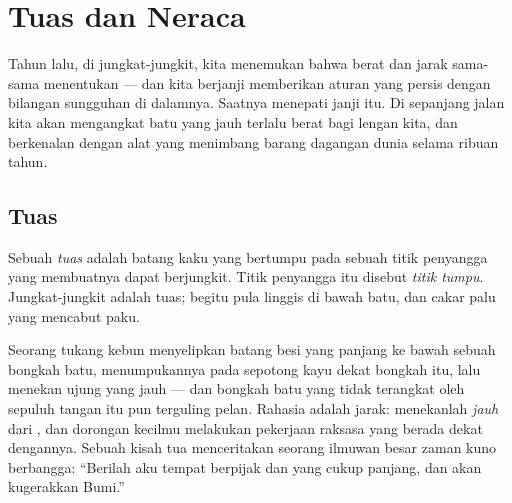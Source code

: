 \chapter{Tuas dan Neraca}\label{ch:g3:levers-and-scales}

Tahun lalu, di jungkat-jungkit, kita menemukan bahwa berat dan jarak
sama-sama menentukan --- dan kita berjanji memberikan aturan yang
persis dengan bilangan sungguhan di dalamnya. Saatnya menepati janji
itu. Di sepanjang jalan kita akan mengangkat batu yang jauh terlalu
berat bagi lengan kita, dan berkenalan dengan alat yang menimbang
barang dagangan dunia selama ribuan tahun.

\section{Tuas}

\begin{definition}\label{def:g3:levers-and-scales:lever}
Sebuah \emph{tuas} adalah batang kaku yang bertumpu pada
sebuah titik penyangga yang membuatnya dapat berjungkit. Titik
penyangga itu disebut \emph{titik tumpu}.
Jungkat-jungkit adalah tuas; begitu pula linggis di bawah batu, dan
cakar palu yang mencabut paku.
\end{definition}

\begin{example}\label{ex:g3:levers-and-scales:crowbar}
Seorang tukang kebun menyelipkan batang besi yang panjang ke bawah
sebuah bongkah batu, menumpukannya pada sepotong kayu dekat bongkah
itu, lalu menekan ujung yang jauh --- dan bongkah batu yang tidak
terangkat oleh sepuluh tangan itu pun terguling pelan. Rahasia 
adalah jarak: menekanlah \emph{jauh} dari , dan dorongan
kecilmu melakukan pekerjaan raksasa yang berada dekat dengannya.
Sebuah kisah tua menceritakan seorang ilmuwan besar zaman kuno
berbangga: ``Berilah aku tempat berpijak dan  yang cukup panjang,
dan akan kugerakkan Bumi.''
\end{example}

